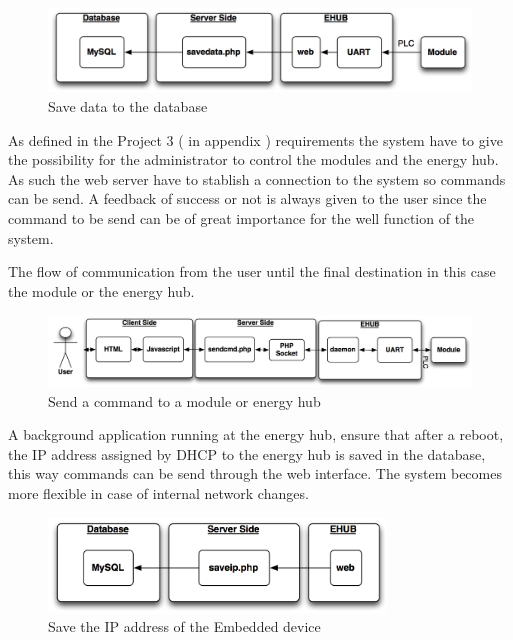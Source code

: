 \begin{figure}[H]
	\begin{centering}
		\includegraphics[width=1\textwidth]{images/savedata.png}
		\caption{Save data to the database}
	\end{centering}
\end{figure}

As defined in the Project 3 ( in appendix ) requirements the system have to give the possibility for the administrator to control the modules and the energy hub. As such the web server have to stablish a connection to the system so commands can be send. A feedback of success or not is always given to the user since the command to be send can be of great importance for the well function of the system.

The flow of communication from the user until the final destination in this case the module or the energy hub.
\begin{figure}[H]
	\begin{centering}
		\includegraphics[width=1\textwidth]{images/sendcmd.png}
		\caption{Send a command to a module or energy hub}
	\end{centering}
\end{figure}

A background application running at the energy hub, ensure that after a reboot, the IP address assigned by DHCP to the energy hub is saved in the database, this way commands can be send through the web interface. The system becomes more flexible in case of internal network changes.
\begin{figure}[H]
	\begin{centering}
		\includegraphics[width=0.8\textwidth]{images/saveip.png}
		\caption{Save the IP address of the Embedded device}
	\end{centering}
\end{figure}

